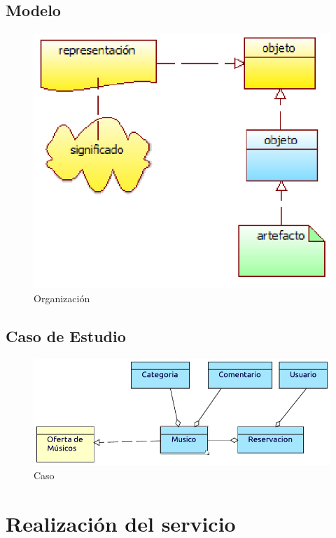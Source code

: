 \subsection{Modelo}
\begin{figure}[h!]
	\centering
	\includegraphics[width=0.8\linewidth]{Arquitectura/Tecnologia/imgs/estructuraMetamodelo.PNG}
	\caption{Organización}
\end{figure}
\newpage
\subsection{Caso de Estudio}

\begin{figure}[h!]
	\centering
	\includegraphics[width=\linewidth]{Arquitectura/Tecnologia/imgs/estructura.pdf}
	\caption{Caso}
\end{figure}

\newpage

\section{Realización del servicio}

